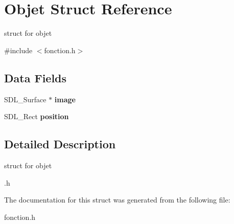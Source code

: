 \hypertarget{structObjet}{}\section{Objet Struct Reference}
\label{structObjet}


struct for objet  




{\ttfamily \#include $<$fonction.\+h$>$}

\subsection*{Data Fields}
\begin{DoxyCompactItemize}
\item 
\mbox{\label{structObjet_adc26449d5051fc613b8972a08a3e7bba}} 
S\+D\+L\+\_\+\+Surface $\ast$ {\bfseries image}
\item 
\mbox{\label{structObjet_a92fd979dc6d37621933bf051914da800}} 
S\+D\+L\+\_\+\+Rect {\bfseries position}
\end{DoxyCompactItemize}


\subsection{Detailed Description}
struct for objet 

.h 

The documentation for this struct was generated from the following file\+:\begin{DoxyCompactItemize}
\item 
fonction.\+h\end{DoxyCompactItemize}
